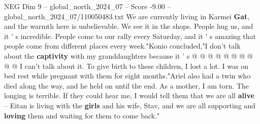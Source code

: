 \begin{textsample}{NEG Dim 9 – global\_north\_2024\_07 – Score -9.00 – global\_north\_2024\_07/110050483.txt}
We are currently living in Karmei \textbf{Gat}, and the warmth here is unbelievable.
We see it in the shops.
People hug us, and it ' s incredible.
People come to our rally every Saturday, and it ' s amazing that people come from different places every week."Konio concluded,"I don't talk about the \textbf{captivity} with my granddaughters because it ' s @ @ @ @ @ @ @ @ @ @ I can't talk about it.
To give birth to these children, I lost a lot.
I was on bed rest while pregnant with them for eight months."Ariel also had a twin who died along the way, and he held on until the end.
As a mother, I am torn.
The longing is terrible.
If they could hear me, I would tell them that we are all \textbf{alive} -- Eitan is living with the \textbf{girls} and his wife, Stav, and we are all supporting and \textbf{loving} them and waiting for them to come back."

\end{textsample}
